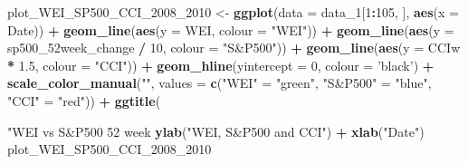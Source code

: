 \documentclass[]{article}
\newenvironment{Shaded}{\begin{snugshade}}{\end{snugshade}}
\newcommand{\KeywordTok}[1]{\textcolor[rgb]{0.13,0.29,0.53}{\textbf{#1}}}
\newcommand{\DataTypeTok}[1]{\textcolor[rgb]{0.13,0.29,0.53}{#1}}
\newcommand{\DecValTok}[1]{\textcolor[rgb]{0.00,0.00,0.81}{#1}}
\newcommand{\FloatTok}[1]{\textcolor[rgb]{0.00,0.00,0.81}{#1}}
\newcommand{\StringTok}[1]{\textcolor[rgb]{0.31,0.60,0.02}{#1}}
\newcommand{\OperatorTok}[1]{\textcolor[rgb]{0.81,0.36,0.00}{\textbf{#1}}}
\newcommand{\NormalTok}[1]{#1}
\begin{document}
\begin{Shaded}
\begin{Highlighting}[]
{\NormalTok{plot_WEI_SP500_CCI_2008_}\DecValTok{2010}\NormalTok{ <-}\StringTok{ }\KeywordTok{ggplot}\NormalTok{(}\DataTypeTok{data =}\NormalTok{ data_}\DecValTok{1}\NormalTok{[}\DecValTok{1}\OperatorTok{:}\DecValTok{105}\NormalTok{, ], }\KeywordTok{aes}\NormalTok{(}\DataTypeTok{x =}\NormalTok{ Date)) }\OperatorTok{+}
\StringTok{  }\KeywordTok{geom_line}\NormalTok{(}\KeywordTok{aes}\NormalTok{(}\DataTypeTok{y =}\NormalTok{ WEI, }\DataTypeTok{colour =} \StringTok{"WEI"}\NormalTok{)) }\OperatorTok{+}\StringTok{ }
\StringTok{  }\KeywordTok{geom_line}\NormalTok{(}\KeywordTok{aes}\NormalTok{(}\DataTypeTok{y =}\NormalTok{ sp500_52week_change }\OperatorTok{/}\StringTok{ }\DecValTok{10}\NormalTok{, }\DataTypeTok{colour =} \StringTok{"S&P500"}\NormalTok{)) }\OperatorTok{+}
\StringTok{  }\KeywordTok{geom_line}\NormalTok{(}\KeywordTok{aes}\NormalTok{(}\DataTypeTok{y =}\NormalTok{ CCIw }\OperatorTok{*}\StringTok{ }\FloatTok{1.5}\NormalTok{, }\DataTypeTok{colour =} \StringTok{"CCI"}\NormalTok{)) }\OperatorTok{+}
\StringTok{  }\KeywordTok{geom_hline}\NormalTok{(}\DataTypeTok{yintercept =} \DecValTok{0}\NormalTok{, }\DataTypeTok{colour =} \StringTok{'black'}\NormalTok{) }\OperatorTok{+}
\StringTok{  }\KeywordTok{scale_color_manual}\NormalTok{(}\StringTok{""}\NormalTok{, }\DataTypeTok{values =} \KeywordTok{c}\NormalTok{(}\StringTok{"WEI"}\NormalTok{ =}\StringTok{ "green"}\NormalTok{, }\StringTok{"S&P500"}\NormalTok{ =}\StringTok{ "blue"}\NormalTok{, }\StringTok{"CCI"}\NormalTok{ =}\StringTok{ "red"}\NormalTok{)) }\OperatorTok{+}\StringTok{ }
\StringTok{  }\KeywordTok{ggtitle}\NormalTok{(}\StringTok{"WEI vs S&P500 52 week % change scaled by 10 vs CCI scaled by 1.5 during 2008-2010"}\NormalTok{) }\OperatorTok{+}\StringTok{ }
\StringTok{  }\KeywordTok{ylab}\NormalTok{(}\StringTok{"WEI, S&P500 and CCI"}\NormalTok{) }\OperatorTok{+}\StringTok{ }
\StringTok{  }\KeywordTok{xlab}\NormalTok{(}\StringTok{"Date"}\NormalTok{) }
\NormalTok{plot_WEI_SP500_CCI_2008_}\DecValTok{2010}

}}
\end{Highlighting}
\end{Shaded}
\end{document}
